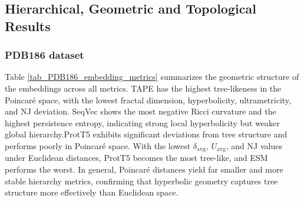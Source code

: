 \documentclass[]{Liebert_Author_revised}
\begin{document}
       

\subsection{Hierarchical, Geometric and Topological Results}

\subsubsection{PDB186 dataset}
Table \ref{tab_PDB186_embedding_metrics} summarizes the geometric structure of the embeddings across all metrics. TAPE has the highest tree-likeness in the Poincaré space, with the lowest fractal dimension, hyperbolicity, ultrametricity, and NJ deviation. SeqVec shows the most negative Ricci curvature and the highest persistence entropy, indicating strong local hyperbolicity but weaker global hierarchy.ProtT5 exhibits significant deviations from tree structure and performs poorly in Poincaré space.
With the lowest $\delta_{\text{avg}}$, $U_{\text{avg}}$, and NJ values under Euclidean distances, ProtT5 becomes the most tree-like, and ESM performs the worst. In general, Poincaré distances yield far smaller and more stable hierarchy metrics, confirming that hyperbolic geometry captures tree structure more effectively than Euclidean space.
\end{document}
